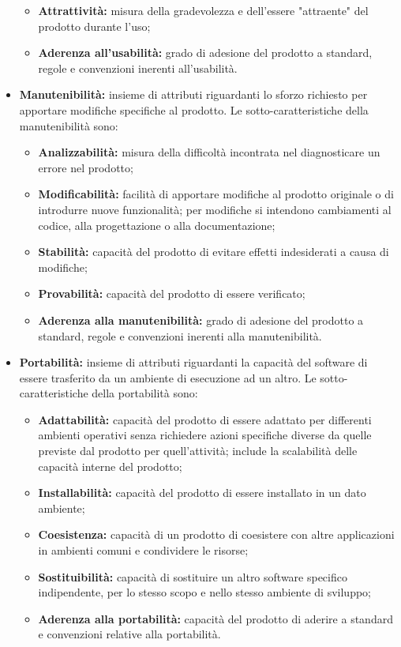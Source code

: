 \begin{itemize}
\begin{itemize}
              \item \textbf{Attrattività:} misura della gradevolezza e dell'essere "attraente" del prodotto durante l'uso;
              \item \textbf{Aderenza all'usabilità:} grado di adesione del prodotto a standard, regole e convenzioni inerenti all'usabilità.
          \end{itemize}
    \item \textbf{Manutenibilità:} insieme di attributi riguardanti lo sforzo richiesto per apportare modifiche specifiche al prodotto.
          Le sotto-caratteristiche della manutenibilità sono:
          \begin{itemize}
              \item \textbf{Analizzabilità:} misura della difficoltà incontrata nel diagnosticare un errore nel prodotto;
              \item \textbf{Modificabilità:} facilità di apportare modifiche al prodotto originale o di introdurre nuove funzionalità; per modifiche si intendono cambiamenti al codice, alla progettazione o alla documentazione;
              \item \textbf{Stabilità:} capacità del prodotto di evitare effetti indesiderati a causa di modifiche;
              \item \textbf{Provabilità:} capacità del prodotto di essere verificato;
              \item \textbf{Aderenza alla manutenibilità:} grado di adesione del prodotto a standard, regole e convenzioni inerenti alla manutenibilità.
          \end{itemize}
    \item \textbf{Portabilità:} insieme di attributi riguardanti la capacità del software di essere trasferito da un ambiente di esecuzione ad un altro.
          Le sotto-caratteristiche della portabilità sono:
          \begin{itemize}
              \item \textbf{Adattabilità:} capacità del prodotto di essere adattato per differenti ambienti operativi senza richiedere azioni specifiche diverse da quelle previste dal prodotto per quell'attività; include la scalabilità delle capacità interne del prodotto;
              \item \textbf{Installabilità:} capacità del prodotto di essere installato in un dato ambiente;
              \item \textbf{Coesistenza:} capacità di un prodotto di coesistere con altre applicazioni in ambienti comuni e condividere le risorse;
              \item \textbf{Sostituibilità:} capacità di sostituire un altro software specifico indipendente, per lo stesso scopo e nello stesso ambiente di sviluppo;
              \item \textbf{Aderenza alla portabilità:} capacità del prodotto di aderire a standard e convenzioni relative alla portabilità.
          \end{itemize}
\end{itemize}


